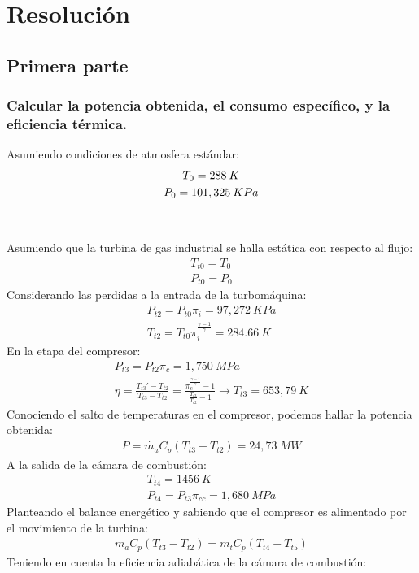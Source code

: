 \documentclass{report}
\begin{document}
\section{Resolución}
\subsection{Primera parte}
\subsubsection{Calcular la potencia obtenida, el consumo específico, y la eficiencia térmica.}
Asumiendo condiciones de atmosfera estándar:
\begin{gather}
T_0 = 288\:K\\
\vspace{1cm}
P_0 = 101,325\:KPa
\end{gather}
Asumiendo que la turbina de gas industrial se halla estática con respecto al flujo:
\begin{gather}
T_{t0} = T_0\\
P_{t0} = P_0
\end{gather}
Considerando las perdidas a la entrada de la turbomáquina:
\begin{gather}
P_{t2} = P_{t0} \pi_i=97,272\:KPa\\
T_{t2} = T_{t0} \pi_i^{\frac{\gamma-1}{\gamma}} = 284.66\:K
\end{gather}
En la etapa del compresor:
\begin{gather}
P_{t3} = P_{t2} \pi_c=1,750\:MPa\\
\eta = \frac{T_{t3}'-T_{t2}}{T_{t3}-T_{t2}}=\frac{\pi_c^\frac{\gamma-1}{\gamma}-1}{\frac{T_{t3}}{T_{t2}}-1}\xrightarrow{}T_{t3} = 653,79\:K
\end{gather}
Conociendo el salto de temperaturas en el compresor, podemos hallar la potencia obtenida:
\begin{gather}
P=\Dot{m_a}C_p(T_{t3}-T_{t2})=\boxed{24,73\:MW}
\end{gather}
A la salida de la cámara de combustión:
\begin{gather}
T_{t4} = 1456\:K\\
P_{t4} = P_{t3} \pi_{cc}=1,680\:MPa
\end{gather}
Planteando el balance energético y sabiendo que el compresor es alimentado por el movimiento de la turbina:
\begin{gather}
\Dot{m_a}C_p(T_{t3}-T_{t2})=\Dot{m_t}C_p(T_{t4}-T_{t5})
\end{gather}
Teniendo en cuenta la eficiencia adiabática de la cámara de combustión:
\end{document}
